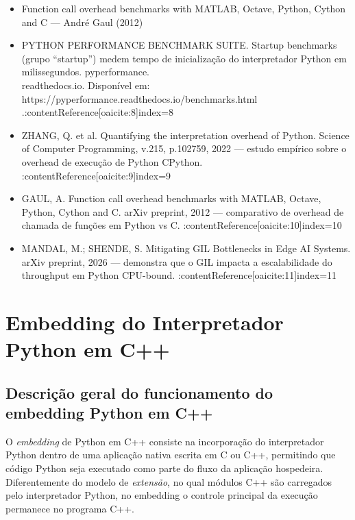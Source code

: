 \begin{itemize}
   \item Function call overhead benchmarks with MATLAB, Octave, Python, Cython and C — André Gaul (2012)

   \item PYTHON PERFORMANCE BENCHMARK SUITE. Startup benchmarks (grupo “startup”) medem tempo de inicialização do interpretador Python em milissegundos. pyperformance.\\readthedocs.io. Disponível em: https://pyperformance.readthedocs.io/benchmarks.html\\.:contentReference[oaicite:8]{index=8}

   \item ZHANG, Q. et al. Quantifying the interpretation overhead of Python. Science of Computer Programming, v.215, p.102759, 2022 — estudo empírico sobre o overhead de execução de Python CPython. :contentReference[oaicite:9]{index=9}

   \item GAUL, A. Function call overhead benchmarks with MATLAB, Octave, Python, Cython and C. arXiv preprint, 2012 — comparativo de overhead de chamada de funções em Python vs C. :contentReference[oaicite:10]{index=10}

   \item MANDAL, M.; SHENDE, S. Mitigating GIL Bottlenecks in Edge AI Systems. arXiv preprint, 2026 — demonstra que o GIL impacta a escalabilidade do throughput em Python CPU-bound. :contentReference[oaicite:11]{index=11}


\end{itemize}


\section{Embedding do Interpretador Python em C++}

\subsection{Descrição geral do funcionamento do embedding Python em C++}

O \textit{embedding} de Python em C++ consiste na incorporação do interpretador Python dentro de uma aplicação nativa escrita em C ou C++, permitindo que código Python seja executado como parte do fluxo da aplicação hospedeira. Diferentemente do modelo de \textit{extensão}, no qual módulos C++ são carregados pelo interpretador Python, no embedding o controle principal da execução permanece no programa C++.

